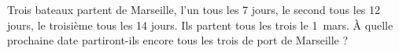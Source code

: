 
Trois bateaux partent de Marseille, l'un tous les 7 jours, le second tous les 12 jours, le troisième tous les 14 jours. Ils partent tous les trois le 1\ier\ mars. \`A quelle prochaine date partiront-ils encore tous les trois de port de Marseille ?
